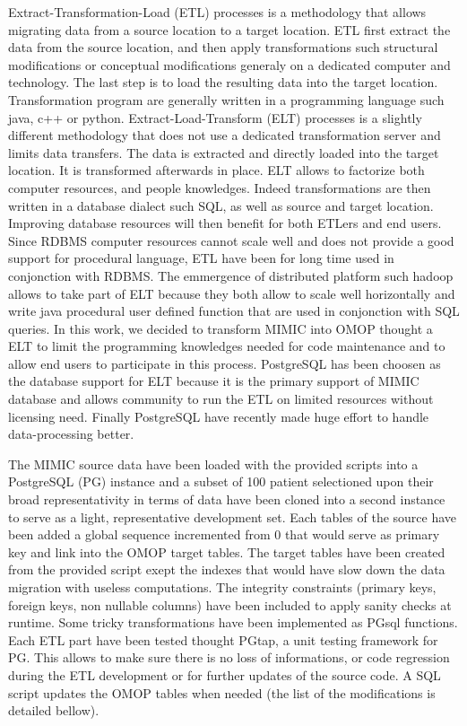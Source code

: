 Extract-Transformation-Load (ETL) processes is a methodology that allows
migrating data from a source location to a target location. ETL first extract
the data from the source location, and then apply transformations such
structural modifications or conceptual modifications generaly on a dedicated
computer and technology. The last step is to load the resulting data into the
target location. Transformation program are generally written in a programming
language such java, c++ or python.
Extract-Load-Transform (ELT) processes is a slightly different methodology that
does not use a dedicated transformation server and limits data transfers. The
data is extracted and directly loaded into the target location. It is
transformed afterwards in place. ELT allows to factorize both computer
resources, and people knowledges. Indeed transformations are then written in a
database dialect such SQL, as well as source and target location. Improving
database resources will then benefit for both ETLers and end users. Since RDBMS
computer resources cannot scale well and does not provide a good support for
procedural language, ETL have been for long time used in conjonction with
RDBMS. The emmergence of distributed platform such hadoop allows to take part
of ELT because they both allow to scale well horizontally and write java
procedural user defined function that are used in conjonction with SQL queries.
In this work, we decided to transform MIMIC into OMOP thought a ELT to limit
the programming knowledges needed for code maintenance and to allow end users
to participate in this process. PostgreSQL has been choosen as the database
support for ELT because it is the primary support of MIMIC database and allows
community to run the ETL on limited resources without licensing need. Finally
PostgreSQL have recently made huge effort to handle data-processing better.


The MIMIC source data have been loaded with the provided scripts into a
PostgreSQL (PG) instance and a subset of 100 patient selectioned upon their
broad representativity in terms of data have been cloned into a second instance
to serve as a light, representative development set.
Each tables of the source have been added a global sequence incremented from 0
that would serve as primary key and link into the OMOP target tables. The
target tables have been created from the provided script exept the indexes
that would have slow down the data migration with useless computations. The
integrity constraints (primary keys, foreign keys, non nullable columns) have
been included to apply sanity checks at runtime. Some tricky transformations
have been implemented as PGsql functions.
Each ETL part have been tested thought PGtap, a unit testing framework for PG.
This allows to make sure there is no loss of informations, or code regression
during the ETL development or for further updates of the source code.
A SQL script updates the OMOP tables when needed (the list of the modifications
is detailed bellow). 

